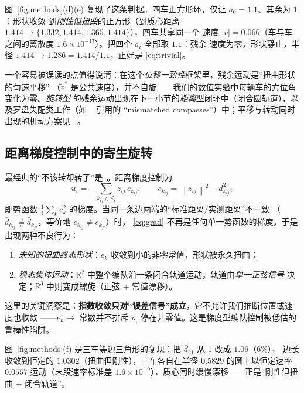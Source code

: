 \documentclass[11pt,a4paper]{ctexart}
\theoremstyle{plain}
\theoremstyle{definition}
\theoremstyle{remark}
\newcommand{\R}{\mathbb{R}}
\newcommand{\norm}[1]{\left\|#1\right\|}
\newcommand{\abs}[1]{\left|#1\right|}
\begin{document}
图~\ref{fig:methods}(d)(e) 复现了这条判据。四车正方形环，仅让 $a_0=1.1$、其余为 $1$：形状收敛
到\emph{刚性但扭曲}的正方形（到质心距离 $1.414\to\{1.332,1.414,1.365,1.414\}$），四车共享同一个
速度 $\abs{v}=0.066$（车与车之间的离散度 $1.6\times10^{-17}$）。把四个 $a_i$ 全部取 $1.1$：残余
速度为零，形状静止，半径 $1.414\to1.286=1.414/1.1$，正好是 \eqref{eq:trivial}。

一个容易被误读的点值得说清：在这个\emph{位移一致性}框架里，残余运动是“扭曲形状的匀速平移”
（$\tilde v^*$ 是公共速度），并不自旋——我们的数值实验中每辆车的方位角变化为零。\emph{旋转型}
的残余运动出现在下一小节的\emph{距离}型闭环中（闭合圆轨道），以及罗盘失配类工作（如
~\cite{tac2021} 引用的 “mismatched compasses”）中；平移与转动同时出现的机动方案见
~\cite{tro2016}。

\subsection{距离梯度控制中的寄生旋转}
\label{sec:meth_parasitic}

最经典的“不该转却转了”是~\cite{tro2015}。距离梯度控制为
\begin{equation}
  u_i=-\sum_{k_{ij}\in\mathcal E_i}z_{ij}\,e_{k_{ij}},
  \qquad
  e_{k_{ij}}=\norm{z_{ij}}^2-d_{k_{ij}}^2 ,
  \label{eq:grad}
\end{equation}
即势函数 $\frac14\sum_k e_k^2$ 的梯度。当同一条边两端的“标准距离/实测距离”不一致
（$\bar d_{k_{ij}}\neq\bar d_{k_{ji}}$，等价地 $e_{k_{ij}}\neq e_{k_{ji}}$）时，
\eqref{eq:grad} 不再是任何单一势函数的梯度，于是出现两种不良行为：
\begin{enumerate}[leftmargin=2.2em]
  \item \emph{未知的扭曲终态形状}：$e_k$ 收敛到小的非零常值，形状被永久扭曲；
  \item \emph{稳态集体运动}：$\R^2$ 中整个编队沿一条闭合轨道运动，轨道由\emph{单一正弦信号}
        决定；$\R^3$ 中则变成螺旋（正弦 + 常值漂移）。
\end{enumerate}
这里的关键洞察是：\textbf{指数收敛只对“误差信号”成立}，它不允许我们推断位置或速度也收敛
——$e_k\to$ 常数并不排斥 $\dot p_i$ 停在非零值。这是梯度型编队控制被低估的鲁棒性陷阱。

图~\ref{fig:methods}(f) 是三车等边三角形的复现：把 $\bar d_{21}$ 从 $1$ 改成 $1.06$（$6\%$），
边长收敛到恒定的 $1.0302$（扭曲但刚性），三车各自在半径 $0.5829$ 的圆上以恒定速率 $0.0557$
运动（末段速率标准差 $1.6\times10^{-9}$），质心同时缓慢漂移——正是“刚性但扭曲 + 闭合轨道”。
\end{document}
